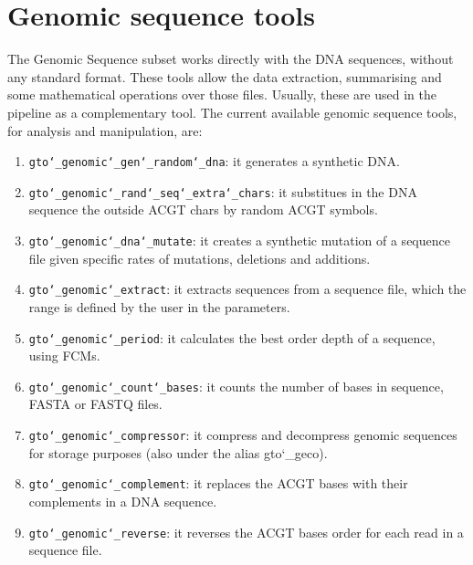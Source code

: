 \chapter{Genomic sequence tools}
\label{gst}
The Genomic Sequence subset works directly with the DNA sequences, without any standard format. These tools allow the data extraction, summarising and some mathematical operations over those files. Usually, these are used in the pipeline as a complementary tool. The current available genomic sequence tools, for analysis and manipulation, are:
\begin{enumerate}

\item \texttt{gto\char`_genomic\char`_gen\char`_random\char`_dna}: it generates a synthetic DNA.

\item \texttt{gto\char`_genomic\char`_rand\char`_seq\char`_extra\char`_chars}: it substitues in the DNA sequence the outside ACGT chars by random ACGT symbols.

\item \texttt{gto\char`_genomic\char`_dna\char`_mutate}: it creates a synthetic mutation of a sequence file given specific rates of mutations, deletions and additions.

\item \texttt{gto\char`_genomic\char`_extract}: it extracts sequences from a sequence file, which the range is defined by the user in the parameters.

\item \texttt{gto\char`_genomic\char`_period}: it calculates the best order depth of a sequence, using FCMs.

\item \texttt{gto\char`_genomic\char`_count\char`_bases}: it counts the number of bases in sequence, FASTA or FASTQ files.

\item \texttt{gto\char`_genomic\char`_compressor}: it compress and decompress genomic sequences for storage purposes (also under the alias gto\char`_geco).

\item \texttt{gto\char`_genomic\char`_complement}: it replaces the ACGT bases with their complements in a DNA sequence.

\item \texttt{gto\char`_genomic\char`_reverse}: it reverses the ACGT bases order for each read in a sequence file.

\end{enumerate}










